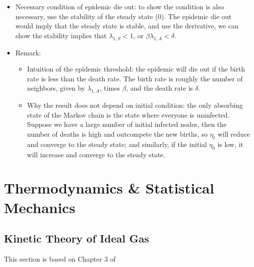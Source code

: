 \documentclass{report}
\begin{document}
\begin{enumerate}
\begin{itemize}
\item Necessary condition of epidemic die out: to show the condition is also necessary, use the stability of the steady state (0). The epidemic die out would imply that the steady state is stable, and use the derivative, we can show the stability implies that $\lambda_{1,S} < 1$, or $\beta \lambda_{1,A} < \delta$. 

\item Remark: 
\begin{itemize}
\item Intuition of the epidemic threshold: the epidemic will die out if the birth rate is less than the death rate. The birth rate is roughly the number of neighbors, given by $\lambda_{1,A}$, times $\beta$, and the death rate is $\delta$. 
\item Why the result does not depend on initial condition: the only absorbing state of the Markov chain is the state where everyone is uninfected. Suppose we have a large number of initial infected nodes, then the number of deaths is high and outcompete the new births, so $\eta_t$ will reduce and converge to the steady state; and similarly, if the initial $\eta_0$ is low, it will increase and converge to the steady state. 
\end{itemize}
\end{itemize}

\end{enumerate}
\chapter{Thermodynamics \& Statistical Mechanics}
\section{Kinetic Theory of Ideal Gas} 
This section is based on Chapter 3 of \cite{Nelson04}
\end{document}
